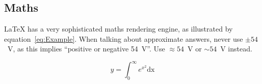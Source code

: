 
\subsection{Maths}

\LaTeX{} has a very sophisticated maths rendering engine, as illustrated by equation~\ref{eq:Example}.  When talking about approximate answers, never use $\pm{54}$~V, as this implies ``positive or negative 54~V''.  Use $\approx{54}$~V or $\sim{54}$~V instead.

\begin{equation}
  y = \int_0^\infty e^{x^2} \mathrm{dx}
  \label{eq:Example}
\end{equation}


